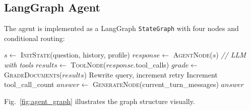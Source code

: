 \documentclass[lettersize,journal]{IEEEtran}
\begin{document}
\subsection{LangGraph Agent}

The agent is implemented as a LangGraph \texttt{StateGraph} with four nodes and conditional routing:

\begin{algorithm}[H]
\caption{Agent graph execution.}\label{alg:agent}
\begin{algorithmic}
\STATE $s \gets$ \textsc{InitState}(question, history, profile)
\REPEAT
    \STATE $response \gets$ \textsc{AgentNode}($s$) \hfill \textit{// LLM with tools}
        \STATE $results \gets$ \textsc{ToolNode}($response$.tool\_calls)
        \STATE $grade \gets$ \textsc{GradeDocuments}($results$)
            \STATE Rewrite query, increment retry
        \ENDIF
        \STATE Increment tool\_call\_count
    \ENDIF
{}
\STATE $answer \gets$ \textsc{GenerateNode}(current\_turn\_messages)
\RETURN $answer$
\end{algorithmic}
\end{algorithm}

Fig.~\ref{fig:agent_graph} illustrates the graph structure visually.
\end{document}

